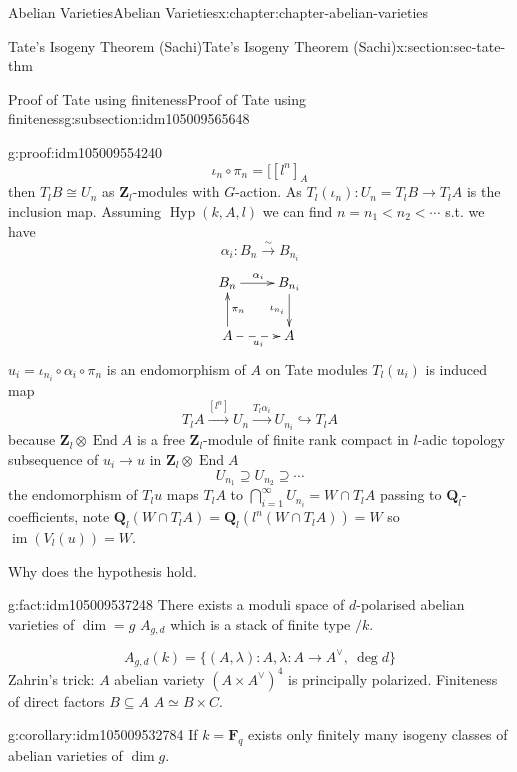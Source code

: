 \documentclass[oneside,10pt,]{book}
\numberwithin{equation}{section}
\newcommand{\lb}{[}
\newcommand{\ZZ}{\mathbf{Z}}
\newcommand{\QQ}{\mathbf{Q}}
\newcommand{\FF}{\mathbf{F}}
\DeclareMathOperator{\End}{End}
\DeclareMathOperator{\im}{im}
\newcommand{\lt}{<}
\begin{document}
\begin{chapterptx}{Abelian Varieties}{}{Abelian Varieties}{}{}{x:chapter:chapter-abelian-varieties}
\begin{sectionptx}{Tate's Isogeny Theorem (Sachi)}{}{Tate's Isogeny Theorem (Sachi)}{}{}{x:section:sec-tate-thm}
\begin{subsectionptx}{Proof of Tate using finiteness}{}{Proof of Tate using finiteness}{}{}{g:subsection:idm105009565648}
\begin{proofptx}{}{g:proof:idm105009554240}
\begin{equation*}
\iota_n \circ \pi_n  =  \lb [l^n]_A
\end{equation*}
then \(T_lB \cong U_n\) as \(\ZZ_l\)-modules with \(G\)-action. As \(T_l(\iota_n) \colon U_n =T_l B  \to T_l A\) is the inclusion map. Assuming \(\operatorname{Hyp}(k,A,l)\) we can find \(n = n_1 \lt n_2 \lt \cdots\) s.t. we have%
\begin{equation*}
\alpha_i \colon B_n \xrightarrow{\sim} B_{n_i}
\end{equation*}
%
\begin{equation*}
\xymatrix{
B_n \ar[r]^{\alpha_i} & B_{n_i} \ar[d]_{\iota_{n_i}}\\
A\ar[u]_{\pi_n} \ar@{-->}_{u_i}[r] & A
}
\end{equation*}
\(u_i = \iota_{n_i} \circ \alpha_i \circ \pi_n\) is an endomorphism of \(A\) on Tate modules \(T_l(u_i)\) is induced map%
\begin{equation*}
T_l A \xrightarrow{[l^n]} U_n \xrightarrow{T_l\alpha_i} U_{n_i} \hookrightarrow T_l A
\end{equation*}
because \(\ZZ_l \otimes \End A\) is a free \(\ZZ_l\)-module of finite rank compact in \(l\)-adic topology subsequence of \(u_i \to u\) in \(\ZZ_l \otimes \End A\)%
\begin{equation*}
U_{n_1} \supseteq U_{n_2} \supseteq \cdots
\end{equation*}
the endomorphism of \(T_l u\) maps \(T_l A\) to \(\bigcap_{i=1}^\infty U_{n_i} = W\cap T_l A\) passing to \(\QQ_l\)-coefficients, note \(\QQ_l(W\cap T_l A) = \QQ_l(l^n(W\cap T_l A)) = W\) so \(\im(V_l(u)) =W\).%
\end{proofptx}
Why does the hypothesis hold.%
\begin{fact}{}{}{g:fact:idm105009537248}%
There exists a moduli space of \(d\)-polarised abelian varieties of \(\dim = g\) \(A_{g,d}\) which is a stack of finite type \(/k\).%
\end{fact}
%
\begin{equation*}
A_{g,d}( k) = \{(A,\lambda) : A , \lambda \colon A \to A^\vee,\ \deg d \}
\end{equation*}
Zahrin's trick: \(A\) abelian variety \((A\times A^\vee)^4\) is principally polarized. Finiteness of direct factors \(B\subseteq A\) \(A\simeq B\times C\).%
\begin{corollary}{}{}{g:corollary:idm105009532784}%
If \(k = \FF_q\) exists only finitely many isogeny classes of abelian varieties of \(\dim g\).%
\end{corollary}

\end{subsectionptx}
\end{sectionptx}
\end{chapterptx}
\end{document}
